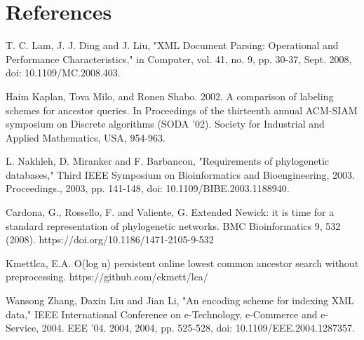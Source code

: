 \documentclass{beamer}
\begin{document}
\section{References}

\begin{frame}
    \scriptsize

    T. C. Lam, J. J. Ding and J. Liu, "XML Document Parsing: Operational and Performance Characteristics," in Computer, vol. 41, no. 9, pp. 30-37, Sept. 2008, doi: 10.1109/MC.2008.403.

    Haim Kaplan, Tova Milo, and Ronen Shabo. 2002. A comparison of labeling schemes for ancestor queries. In Proceedings of the thirteenth annual ACM-SIAM symposium on Discrete algorithms (SODA '02). Society for Industrial and Applied Mathematics, USA, 954-963.

    L. Nakhleh, D. Miranker and F. Barbancon, "Requirements of phylogenetic databases," Third IEEE Symposium on Bioinformatics and Bioengineering, 2003. Proceedings., 2003, pp. 141-148, doi: 10.1109/BIBE.2003.1188940.

    Cardona, G., Rossello, F. and Valiente, G. Extended Newick: it is time for a standard representation of phylogenetic networks. BMC Bioinformatics 9, 532 (2008). https://doi.org/10.1186/1471-2105-9-532

    Kmettlca, E.A. O(log n) persistent online lowest common ancestor search without preprocessing. https://github.com/ekmett/lca/
    
    Wansong Zhang, Daxin Liu and Jian Li, "An encoding scheme for indexing XML data," IEEE International Conference on e-Technology, e-Commerce and e-Service, 2004. EEE '04. 2004, 2004, pp. 525-528, doi: 10.1109/EEE.2004.1287357.
\end{frame}
\end{document}
